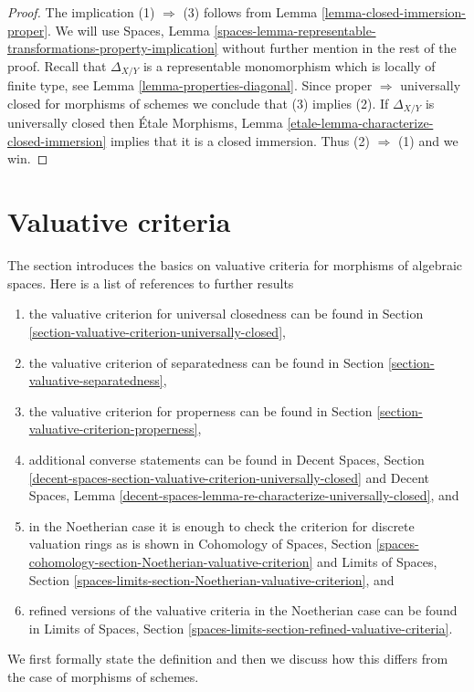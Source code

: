 \begin{proof}
The implication (1) $\Rightarrow$ (3) follows from
Lemma \ref{lemma-closed-immersion-proper}.
We will use
Spaces, Lemma
\ref{spaces-lemma-representable-transformations-property-implication}
without further mention in the rest of the proof.
Recall that $\Delta_{X/Y}$ is a representable
monomorphism which is locally of finite type, see
Lemma \ref{lemma-properties-diagonal}.
Since proper $\Rightarrow$ universally closed for morphisms of schemes
we conclude that (3) implies (2).
If $\Delta_{X/Y}$ is universally closed then
\'Etale Morphisms,
Lemma \ref{etale-lemma-characterize-closed-immersion}
implies that it is a closed immersion. Thus (2) $\Rightarrow$ (1)
and we win.
\end{proof}





\section{Valuative criteria}
\label{section-valuative}

\noindent
The section introduces the basics on valuative criteria for morphisms
of algebraic spaces. Here is a list of references to further results
\begin{enumerate}
\item the valuative criterion for universal closedness can be found in
Section \ref{section-valuative-criterion-universally-closed},
\item the valuative criterion of separatedness can be found in
Section \ref{section-valuative-separatedness},
\item the valuative criterion for properness can be found in
Section \ref{section-valuative-criterion-properness},
\item additional converse statements can be found in
Decent Spaces, Section
\ref{decent-spaces-section-valuative-criterion-universally-closed}
and Decent Spaces, Lemma
\ref{decent-spaces-lemma-re-characterize-universally-closed}, and
\item in the Noetherian case it is enough to check the criterion for
discrete valuation rings as is shown in Cohomology of Spaces, Section
\ref{spaces-cohomology-section-Noetherian-valuative-criterion} and
Limits of Spaces, Section
\ref{spaces-limits-section-Noetherian-valuative-criterion}, and
\item refined versions of the valuative criteria in the Noetherian
case can be found in Limits of Spaces, Section
\ref{spaces-limits-section-refined-valuative-criteria}.
\end{enumerate}
We first formally state the definition and then we discuss how this
differs from the case of morphisms of schemes.

